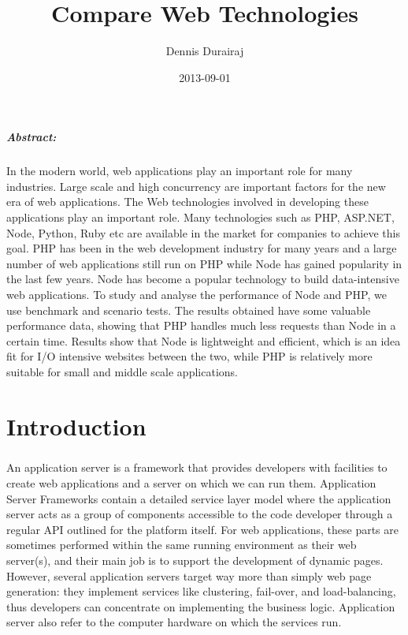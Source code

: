 \documentclass[a4paper, onecolumn, oneside, 11pt, wide, floatssmall]{mwrep}
\title{Compare Web Technologies}
\date{2013-09-01}
\author{Dennis Durairaj}
\begin{document}
\maketitle
{}
\newpage

\paragraph{\textit{Abstract:}}

In the modern world, web applications play an important role for many industries. Large scale and high concurrency are important factors for the new era of web applications. The Web technologies involved in developing these applications play an important role. Many technologies such as PHP, ASP.NET, Node, Python, Ruby etc are available in the market for companies to achieve this goal. PHP has been in the web development industry for many years and a large number of web applications still run on PHP while Node has gained popularity in the last few years. Node has become a popular technology to build data-intensive web applications. To study and analyse the performance of Node and PHP, we use benchmark and scenario tests. The results obtained have some valuable performance data, showing that PHP handles much less requests than Node in a certain time. Results show that Node is lightweight and efficient, which is an idea fit for I/O intensive websites between the two, while PHP is relatively more suitable for small and middle scale applications.

\newpage
{}

\chapter{Introduction}

\paragraph{}
An application server is a framework that provides developers with facilities to create web applications and a server on which we can run them. Application Server Frameworks contain a detailed service layer model where the application server acts as a group of components accessible to the code developer through a regular API outlined for the platform itself. For web applications, these parts are sometimes performed within the same running environment as their web server(s), and their main job is to support the development of dynamic pages. However, several application servers target way more than simply web page generation: they implement services like clustering, fail-over, and load-balancing, thus developers can concentrate on implementing the business logic.
Application server also refer to the computer hardware on which the services run.
\end{document}
